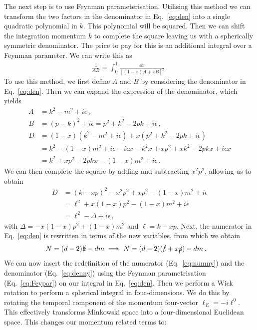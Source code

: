 The next step is to use Feynman parameterisation. Utilising this method we can transform the two factors in the denominator in Eq.~\eqref{eq:den} into a single quadratic polynomial in $k$. This polynomial will be squared. Then we can shift the integration momentum $k$ to complete the square leaving us with a spherically symmetric denominator. The price to pay for this is an additional integral over a Feynman parameter. We can write this as
\begin{align}
    \frac{1}{AB} = \int_0^1 \frac{\dd x}{[(1-x)A + xB]^2}\,.\label{eq:Feypar}
\end{align}
To use this method, we first define $A$ and $B$ by considering the denominator in Eq.~\eqref{eq:den}. Then we can expand the expression of the denominator, which yields
\begin{align}
    A &= k^2 - m^2 + i\epsilon \,,\\
    B &= (p-k)^2 + i\epsilon = p^2 + k^2 - 2pk + i\epsilon \,,\\
    D &= (1-x)(k^2 - m^2 + i\epsilon) + x(p^2 + k^2 - 2pk + i\epsilon)\nonumber\\
    &= k^2 - (1-x)m^2 + i\epsilon - i\epsilon x - k^2 x + xp^2 + x k^2 - 2pkx + i\epsilon x \nonumber\\
    &= k^2 + xp^2 - 2pkx - (1-x)m^2 + i\epsilon\,.
\end{align}
We can then complete the square by adding and subtracting $x^2p^2$, allowing us to obtain
\begin{align}
    D&= (k - xp)^2 - x^2p^2 + xp^2 - (1-x)m^2 + i\epsilon \nonumber\\
    &= \ell^2 + x(1-x)p^2 - (1-x)m^2 + i\epsilon \nonumber\\
    &= \ell^2 - \Delta + i\epsilon\,,\label{eq:denny}
\end{align}
with $\Delta = -x(1-x)p^2 + (1-x)m^2$ and $ \ell = k - xp$. Next, the numerator in Eq.~\eqref{eq:den} is rewritten in terms of the new variables, from which we obtain
\begin{align}
    N &= (d-2)\slashed{k} - dm \implies N=(d-2)(\slashed{\ell} + x\slashed{p}) - dm\,.\label{eq:numny}
\end{align}
We can now insert the redefinition of the numerator (Eq.~\eqref{eq:numny}) and the denominator (Eq.~\eqref{eq:denny}) using the Feynman parametrisation (Eq.~\eqref{eq:Feypar}) on our integral in Eq.~\eqref{eq:den}. Then we perform a Wick rotation to perform a spherical integral in four-dimensions. We do this by rotating the temporal component of the momentum four-vector $\ell_E = -i \ell^0$. This effectively transforms Minkowski space into a four-dimensional Euclidean space. This changes our momentum related terms to: 

